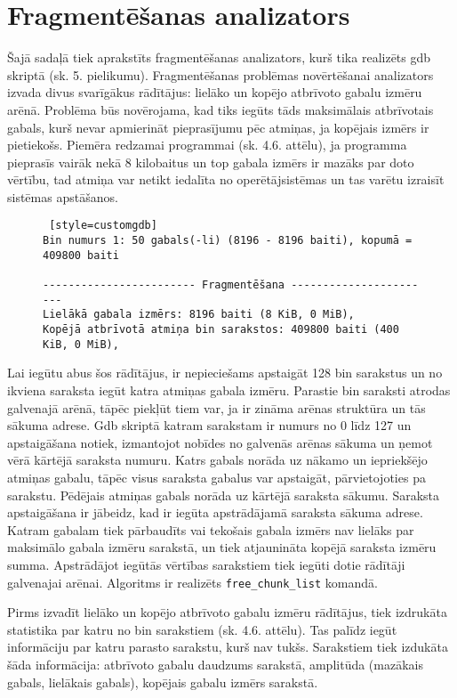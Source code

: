 \section{Fragmentēšanas analizators}
Šajā sadaļā tiek aprakstīts fragmentēšanas analizators, kurš tika realizēts gdb skriptā (sk. 5. pielikumu).
Fragmentēšanas problēmas novērtēšanai analizators izvada divus svarīgākus rādītājus: lielāko un kopējo atbrīvoto gabalu izmēru arēnā.
Problēma būs novērojama, kad tiks iegūts tāds maksimālais atbrīvotais gabals, kurš nevar apmierināt pieprasījumu pēc atmiņas, ja kopējais izmērs ir pietiekošs.
Piemēra redzamai programmai (sk. 4.6. attēlu), ja programma pieprasīs vairāk nekā 8 kilobaitus un top gabala izmērs ir mazāks par doto vērtību, tad atmiņa var netikt iedalīta no operētājsistēmas un tas varētu izraisīt sistēmas apstāšanos.
\begin{figure}[h]
\begin{lstlisting} [style=customgdb]
Bin numurs 1: 50 gabals(-li) (8196 - 8196 baiti), kopumā = 409800 baiti

------------------------ Fragmentēšana -----------------------
Lielākā gabala izmērs: 8196 baiti (8 KiB, 0 MiB),
Kopējā atbrīvotā atmiņa bin sarakstos: 409800 baiti (400 KiB, 0 MiB),
\end{lstlisting}
\caption{\textbf{\fontsize{11}{12}\selectfont {Fragmentēšanas rādītāji}}}
\end{figure}

Lai iegūtu abus šos rādītājus, ir nepieciešams apstaigāt 128 bin sarakstus un no ikviena saraksta iegūt katra atmiņas gabala izmēru.
Parastie bin saraksti atrodas galvenajā arēnā, tāpēc piekļūt tiem var, ja ir zināma arēnas struktūra un tās sākuma adrese.
Gdb skriptā katram sarakstam ir numurs no 0 līdz 127 un apstaigāšana notiek, izmantojot nobīdes no galvenās arēnas sākuma un ņemot vērā kārtējā saraksta numuru.
Katrs gabals norāda uz nākamo un iepriekšējo atmiņas gabalu, tāpēc visus saraksta gabalus var apstaigāt, pārvietojoties pa sarakstu.
Pēdējais atmiņas gabals norāda uz kārtējā saraksta sākumu.
Saraksta apstaigāšana ir jābeidz, kad ir iegūta apstrādājamā saraksta sākuma adrese.
Katram gabalam tiek pārbaudīts vai tekošais gabala izmērs nav lielāks par maksimālo gabala izmēru sarakstā, un tiek atjaunināta kopējā saraksta izmēru summa.
Apstrādājot iegūtās vērtības sarakstiem tiek iegūti dotie rādītāji galvenajai arēnai.
Algoritms ir realizēts \texttt{free\_chunk\_list} komandā.

Pirms izvadīt lielāko un kopējo atbrīvoto gabalu izmēru rādītājus, tiek izdrukāta statistika par katru no bin sarakstiem (sk. 4.6. attēlu).
Tas palīdz iegūt informāciju par katru parasto sarakstu, kurš nav tukšs.
Sarakstiem tiek izdukāta šāda informācija: atbrīvoto gabalu daudzums sarakstā, amplitūda (mazākais gabals, lielākais gabals), kopējais gabalu izmērs sarakstā.



